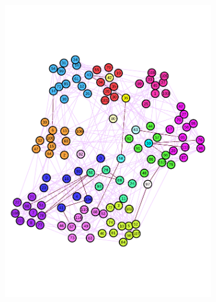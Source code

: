 \begin{figure}[!ht]
\centering
\begin{subfigure}{.3\textwidth} 
\centering
\includegraphics[width=.99\linewidth]{img/chap2/football_neg_edge.pdf}
\caption{}\label{fig:football_groundtruth}
\end{subfigure}
\begin{subfigure}{.3\textwidth}
\centering

\end{subfigure}
\end{figure}
